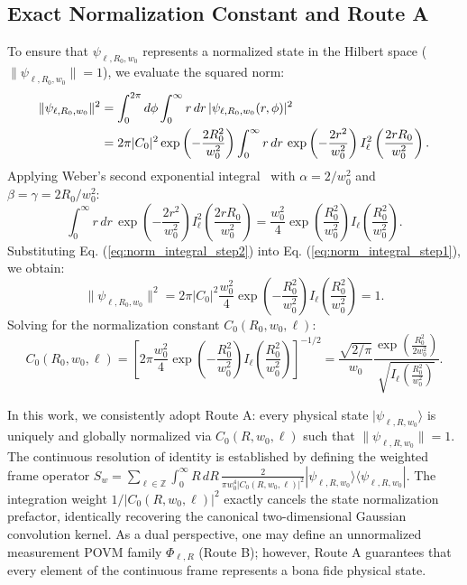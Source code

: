 \documentclass{optica-article}
\begin{document}
\subsection{Exact Normalization Constant and Route A}

To ensure that $\psi_{\ell, R_0, w_0}$ represents a normalized state in the Hilbert space ($\|\psi_{\ell, R_0, w_0}\| = 1$), we evaluate the squared norm:
\begin{align}
\|\psi_{\ell, R_0, w_0}\|^2 &= \int_0^{2\pi} d\phi \int_0^\infty r \, dr \, |\psi_{\ell, R_0, w_0}(r, \phi)|^2 \notag \\
&= 2\pi |C_0|^2 \exp\left( - \frac{2 R_0^2}{w_0^2} \right) \int_0^\infty r \, dr \, \exp\left( - \frac{2 r^2}{w_0^2} \right) I_\ell^2\left( \frac{2 r R_0}{w_0^2} \right).
\label{eq:norm_integral_step1}
\end{align}
Applying Weber's second exponential integral~\cite{Gradshteyn2014} with $\alpha = 2 / w_0^2$ and $\beta = \gamma = 2 R_0 / w_0^2$:
\begin{equation}
\int_0^\infty r \, dr \, \exp\left( - \frac{2 r^2}{w_0^2} \right) I_\ell^2\left( \frac{2 r R_0}{w_0^2} \right) = \frac{w_0^2}{4} \exp\left( \frac{R_0^2}{w_0^2} \right) I_\ell\left( \frac{R_0^2}{w_0^2} \right).
\label{eq:norm_integral_step2}
\end{equation}
Substituting Eq. (\ref{eq:norm_integral_step2}) into Eq. (\ref{eq:norm_integral_step1}), we obtain:
\begin{equation}
\|\psi_{\ell, R_0, w_0}\|^2 = 2\pi |C_0|^2 \frac{w_0^2}{4} \exp\left( - \frac{R_0^2}{w_0^2} \right) I_\ell\left( \frac{R_0^2}{w_0^2} \right) = 1.
\label{eq:norm_integral_step3}
\end{equation}
Solving for the normalization constant $C_0(R_0, w_0, \ell)$:
\begin{equation}
\boxed{C_0(R_0, w_0, \ell) = \left[ 2\pi \frac{w_0^2}{4} \exp\left( - \frac{R_0^2}{w_0^2} \right) I_\ell\left( \frac{R_0^2}{w_0^2} \right) \right]^{-1/2} = \frac{\sqrt{2/\pi}}{w_0} \frac{\exp\left( \frac{R_0^2}{2 w_0^2} \right)}{\sqrt{I_\ell\left( \frac{R_0^2}{w_0^2} \right)}}.}
\label{eq:exact_normalization_constant}
\end{equation}

In this work, we consistently adopt Route A: every physical state $|\psi_{\ell, R, w_0}\rangle$ is uniquely and globally normalized via $C_0(R, w_0, \ell)$ such that $\|\psi_{\ell, R, w_0}\| = 1$. The continuous resolution of identity is established by defining the weighted frame operator $S_w = \sum_{\ell \in \mathbb{Z}} \int_0^\infty R \, dR \, \frac{2}{\pi w_0^4 |C_0(R, w_0, \ell)|^2} |\psi_{\ell, R, w_0}\rangle \langle \psi_{\ell, R, w_0}|$. The integration weight $1/|C_0(R, w_0, \ell)|^2$ exactly cancels the state normalization prefactor, identically recovering the canonical two-dimensional Gaussian convolution kernel. As a dual perspective, one may define an unnormalized measurement POVM family $\Phi_{\ell, R}$ (Route B); however, Route A guarantees that every element of the continuous frame represents a bona fide physical state.
\end{document}
